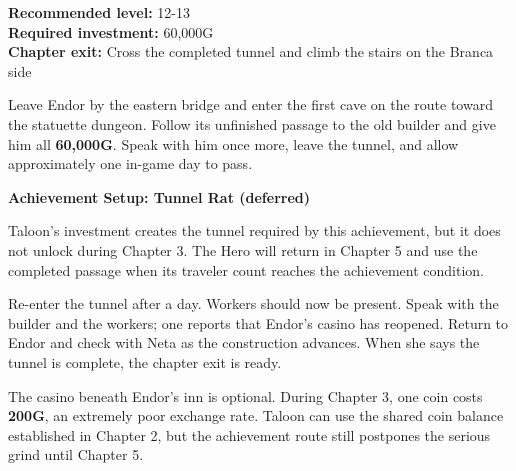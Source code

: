 \documentclass[
  american,
  10pt,
  letterpaper,
  oneside,
  open=any]{scrreprt}
\begin{document}
\textbf{Recommended level:} 12-13\\
\textbf{Required investment:} 60,000G\\
\textbf{Chapter exit:} Cross the completed tunnel and climb the stairs
on the Branca side

Leave Endor by the eastern bridge and enter the first cave on the route
toward the statuette dungeon. Follow its unfinished passage to the old
builder and give him all \textbf{60,000G}. Speak with him once more,
leave the tunnel, and allow approximately one in-game day to pass.

\begin{achievementsetup}

\textbf{Achievement Setup: Tunnel Rat (deferred)}

Taloon's investment creates the tunnel required by this achievement, but
it does not unlock during Chapter 3. The Hero will return in Chapter 5
and use the completed passage when its traveler count reaches the
achievement condition.

\end{achievementsetup}

Re-enter the tunnel after a day. Workers should now be present. Speak
with the builder and the workers; one reports that Endor's casino has
reopened. Return to Endor and check with Neta as the construction
advances. When she says the tunnel is complete, the chapter exit is
ready.

The casino beneath Endor's inn is optional. During Chapter 3, one coin
costs \textbf{200G}, an extremely poor exchange rate. Taloon can use the
shared coin balance established in Chapter 2, but the achievement route
still postpones the serious grind until Chapter 5.
\end{document}
